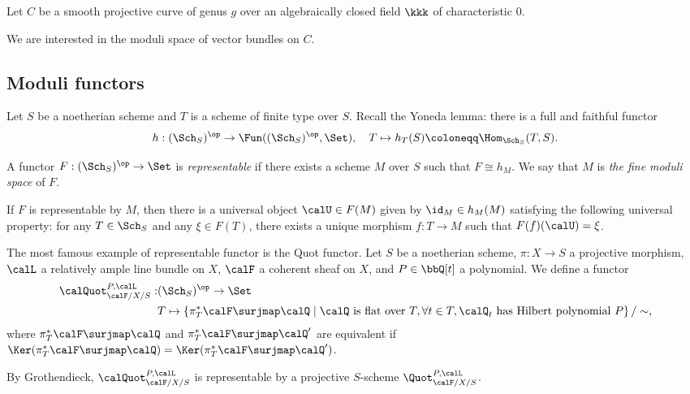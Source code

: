 Let \(C\) be a smooth projective curve of genus \(g\) over an algebraically closed field \(\kkk\) of characteristic \(0\).

    We are interested in the moduli space of vector bundles on \(C\).

\subsection{Moduli functors}

    Let \(S\) be a noetherian scheme and \(T\) is a scheme of finite type over \(S\).
    Recall the Yoneda lemma: 
    there is a full and faithful functor 
    \[ h : (\Sch_S)^{\op} \to \Fun((\Sch_S)^{\op}, \Set), \quad T \mapsto h_T(S) \coloneqq \Hom_{\Sch_S}(T, S). \]
    
    A functor \(F : (\Sch_S)^{\op} \to \Set\) is \emph{representable} if there exists a scheme \(M\) over \(S\) such that \(F \cong h_M\).
    We say that \(M\) is \emph{the fine moduli space} of \(F\).

    \begin{remark}\label{rmk:fine_moduli_space}
        If \(F\) is representable by \(M\), then there is a universal object \(\calU \in F(M)\) given by \(\id_M \in h_M(M)\) satisfying the following universal property: 
        for any \(T \in \Sch_S\) and any \(\xi \in F(T)\), there exists a unique morphism \(f : T \to M\) such that \(F(f)(\calU) = \xi\).
    \end{remark}

    The most famous example of representable functor is the Quot functor.
    Let \(S\) be a noetherian scheme, \(\pi:X \to S\) a projective morphism, \(\calL\) a relatively ample line bundle on \(X\), \(\calF\) a coherent sheaf on \(X\), and \(P \in \bbQ[t]\) a polynomial.
    We define a functor
    \begin{align*}
        \calQuot_{\calF/X/S}^{P,\calL} : & (\Sch_S)^{\op} \to \Set \\
        & T \mapsto 
        \left\{ 
            \pi^*_T \calF \surjmap \calQ 
        \;\middle|\;
            \calQ \text{ is flat over } T, \forall t \in T, \calQ_t \text{ has Hilbert polynomial } P
        \right\}/ \sim,
    \end{align*}
    where \(\pi^*_T \calF \surjmap \calQ\) and \(\pi^*_T \calF \surjmap \calQ'\) are equivalent if \(\Ker(\pi^*_T \calF \surjmap \calQ) = \Ker(\pi^*_T \calF \surjmap \calQ')\).

    By Grothendieck, \(\calQuot_{\calF/X/S}^{P,\calL}\) is representable by a projective \(S\)-scheme \(\Quot_{\calF/X/S}^{P,\calL}\).

